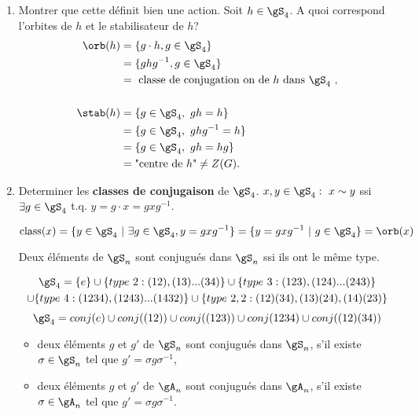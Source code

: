 \begin{exercise}

	\begin{enumerate}
		\item Montrer que cette définit bien une action. Soit $h\in\gS_4$. A quoi correspond l'orbites de $h$ et le stabilisateur de $h$?
		\begin{align*}
			\orb(h) &= \{g\cdot h, g\in\gS_4\}\\
			&= \{ghg^{-1}, g\in\gS_4\}\\
			&= \mbox{ classe de conjugation on de $h$ dans $\gS_4$ },
			\\
			\\
			\stab(h) &= \{g\in\gS_4,\ gh=h\}\\
			&= \{g\in\gS_4,\ ghg^{-1}=h\}\\
			&= \{g\in\gS_4,\ gh=hg\}\\
			&= \mbox{"centre de $h$"} \neq Z(G).
		\end{align*}

		\item Determiner les \textbf{classes de conjugaison} de $\gS_4$. $x,y\in \gS_4:\ x\sim y$ ssi $\exists g\in \gS_4$ t.q. $y=g\cdot x=gxg^{-1}$. 

		$$\mbox{class}(x)=\{y\in\gS_4\ |\ \exists g\in\gS_4, y=gxg^{-1}\}=\{y=gxg^{-1}\ |\ g\in\gS_4\} = \orb(x)$$

		\begin{rappel}
			Deux éléments de $\gS_n$ sont conjugués dans $\gS_n$ ssi ils ont le même type.
		\end{rappel}
		\begin{multline*}
			\gS_4=\{e\}\cup\{type\ 2: (12),(13)...(34)\}\cup\{type\ 3:(123),(124)...(243)\} \\ \cup\{type\ 4: (1234),(1243)...(1432)\}\cup\{type\ 2,2: (12)(34),(13)(24),(14)(23)\}
		\end{multline*}
		$$\gS_4=\\conj(e)\cup \\conj((12))\cup \\conj((123))\cup \\conj(1234)\cup \\conj((12)(34))$$

		\begin{remark}
			\leavevmode
			\begin{itemize}
				\item deux éléments $g$ et $g'$ de $\gS_n$ sont conjugués dans $\gS_n$, s'il existe $\sigma \in \gS_n$ tel que $g'=\sigma g \sigma^{-1}$,
				\item deux éléments $g$ et $g'$ de $\gA_n$ sont conjugués dans $\gA_n$, s'il existe $\sigma\in\gA_n$ tel que $g'=\sigma g\sigma^{-1}$.
			\end{itemize}
		\end{remark}


\end{enumerate}
\end{exercise}
